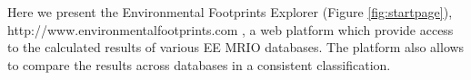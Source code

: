 Here we present the Environmental Footprints Explorer (Figure \ref{fig:startpage}), http://www.environmentalfootprints.com , a web platform which provide access to the calculated results of
various EE MRIO databases. The platform also allows to compare the results across databases in a consistent classification. 